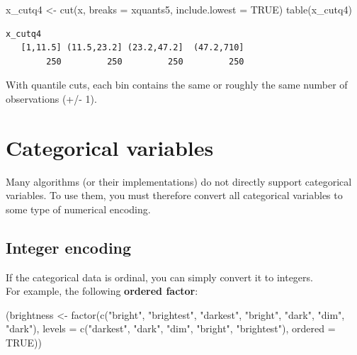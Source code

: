 \documentclass[
]{book}
\newenvironment{Shaded}{\begin{snugshade}}{\end{snugshade}}
\newcommand{\AttributeTok}[1]{\textcolor[rgb]{0.77,0.63,0.00}{#1}}
\newcommand{\ConstantTok}[1]{\textcolor[rgb]{0.00,0.00,0.00}{#1}}
\newcommand{\FunctionTok}[1]{\textcolor[rgb]{0.00,0.00,0.00}{#1}}
\newcommand{\NormalTok}[1]{#1}
\newcommand{\OtherTok}[1]{\textcolor[rgb]{0.56,0.35,0.01}{#1}}
\newcommand{\StringTok}[1]{\textcolor[rgb]{0.31,0.60,0.02}{#1}}
\begin{document}
\begin{Shaded}
\begin{Highlighting}[]
\NormalTok{x\_cutq4 }\OtherTok{\textless{}{-}} \FunctionTok{cut}\NormalTok{(x, }\AttributeTok{breaks =}\NormalTok{ xquants5, }\AttributeTok{include.lowest =} \ConstantTok{TRUE}\NormalTok{)}
\FunctionTok{table}\NormalTok{(x\_cutq4)}
\end{Highlighting}
\end{Shaded}

\begin{verbatim}
x_cutq4
   [1,11.5] (11.5,23.2] (23.2,47.2]  (47.2,710] 
        250         250         250         250 
\end{verbatim}

With quantile cuts, each bin contains the same or roughly the same number of observations (+/- 1).

\hypertarget{categorical-variables}{%
\section{Categorical variables}\label{categorical-variables}}

Many algorithms (or their implementations) do not directly support categorical variables. To use them, you must therefore convert all categorical variables to some type of numerical encoding.

\hypertarget{integer-encoding}{%
\subsection{Integer encoding}\label{integer-encoding}}

If the categorical data is ordinal, you can simply convert it to integers.\\
For example, the following \textbf{ordered factor}:

\begin{Shaded}
\begin{Highlighting}[]
\NormalTok{(brightness }\OtherTok{\textless{}{-}} \FunctionTok{factor}\NormalTok{(}\FunctionTok{c}\NormalTok{(}\StringTok{"bright"}\NormalTok{, }\StringTok{"brightest"}\NormalTok{, }\StringTok{"darkest"}\NormalTok{,}
                        \StringTok{"bright"}\NormalTok{, }\StringTok{"dark"}\NormalTok{, }\StringTok{"dim"}\NormalTok{, }\StringTok{"dark"}\NormalTok{),}
                      \AttributeTok{levels =} \FunctionTok{c}\NormalTok{(}\StringTok{"darkest"}\NormalTok{, }\StringTok{"dark"}\NormalTok{, }\StringTok{"dim"}\NormalTok{, }\StringTok{"bright"}\NormalTok{, }\StringTok{"brightest"}\NormalTok{),}
                      \AttributeTok{ordered =} \ConstantTok{TRUE}\NormalTok{))}
\end{Highlighting}
\end{Shaded}
\end{document}
